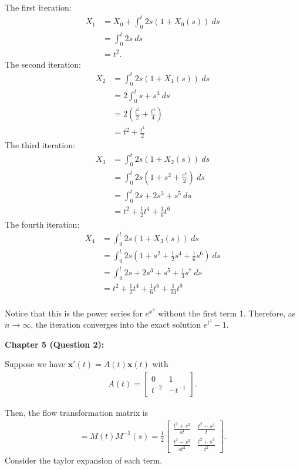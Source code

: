 \documentclass[12pt]{article}
\begin{document}
The first iteration:
\begin{align*}
    X_1 & = X_0 + \int_0^t 2s(1+X_0(s)) ~ ds \\
        & = \int_0^t 2s ~ ds                 \\
        & = t^2.
\end{align*}
The second iteration:
\begin{align*}
    X_2 & = \int_0^t 2s(1+X_1(s)) ~ ds       \\
        & = 2\int_0^t s + s^3  ~ ds          \\
        & = 2(\frac{t^2}{2} + \frac{t^4}{4}) \\
        & = t^2 + \frac{t^4}{2}
\end{align*}
The third iteration:
\begin{align*}
    X_3 & = \int_0^t 2s(1+X_2(s)) ~ ds                \\
        & = \int_0^t 2s(1 + s^2 + \frac{s^4}{2}) ~ ds \\
        & = \int_0^t 2s + 2s^3 + s^5  ~ ds            \\
        & = t^2 + \frac{1}{2}t^4 +\frac{1}{6}t^6
\end{align*}
The fourth iteration:
\begin{align*}
    X_4 & = \int_0^t 2s(1+X_3(s)) ~ ds                                 \\
        & = \int_0^t 2s(1 + s^2 + \frac{1}{2}s^4 +\frac{1}{6}s^6) ~ ds \\
        & = \int_0^t 2s + 2s^3 + s^5 + \frac{1}{3}s^7 ~ ds             \\
        & = t^2 + \frac{1}{2}t^4 +\frac{1}{6}t^6 + \frac{1}{24}t^8     \\
\end{align*}

Notice that this is the power series for $e^{x^2}$ without the first term 1.
Therefore, as $n\rightarrow\infty$, the iteration converges into the exact solution $e^{t^2} - 1$.

\noindent \textbf{Chapter 5 (Question 2):}

Suppose we have $\mathbf{x}'(t) = A(t)\mathbf{x}(t)$ with
\begin{align*}
    A(t) = \begin{bmatrix}
               0 & 1 \\ t^{-2}  & -t^{-1}
           \end{bmatrix}.
\end{align*}

Then, the flow transformation matrix is
\begin{align*}
    [\Phi_{t,s}] = M(t)M^{-1}(s) = \frac{1}{2} \begin{bmatrix}
                                                   \frac{t^2+s^2}{st}   & \frac{t^2-s^2}{t}   \\
                                                   \frac{t^2-s^2}{st^2} & \frac{t^2+s^2}{t^2}
                                               \end{bmatrix}.
\end{align*}
Consider the taylor expansion of each term.
\end{document}
